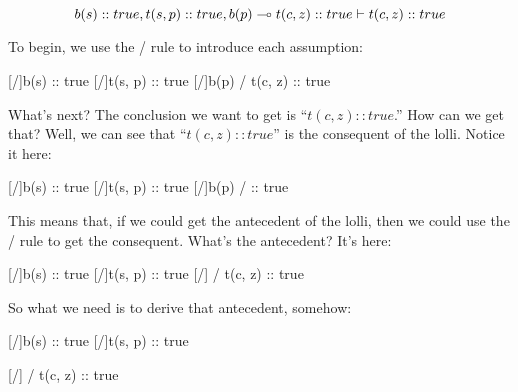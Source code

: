 \documentclass[../../../main.tex]{subfiles}
\begin{document}
\begin{equation*}
  b(s) :: true, t(s, p) :: true, b(p) \lolli/ t(c, z) :: true \ndturnstile/ t(c, z) :: true
\end{equation*}

\noindent
To begin, we use the \startrule/ rule to introduce each assumption:

\begin{prooftree*}
  \hypo{}
  [\startrule/]{b(s) :: true}
  \hypo{}
  [\startrule/]{t(s, p) :: true}  
  \hypo{}
  [\startrule/]{b(p) \lolli/ t(c, z) :: true}  
\end{prooftree*}

\noindent
What's next? The conclusion we want to get is ``$t(c, z) :: true$.'' How can we get that? Well, we can see that ``$t(c, z) :: true$'' is the consequent of the lolli. Notice it here:

\begin{prooftree*}
  \hypo{}
  [\startrule/]{b(s) :: true}
  \hypo{}
  [\startrule/]{t(s, p) :: true}  
  \hypo{}
  [\startrule/]{b(p) \lolli/  :: true}  
\end{prooftree*}

\noindent
This means that, if we could get the antecedent of the lolli, then we could use the \lolliElim/ rule to get the consequent. What's the antecedent? It's here:

\begin{prooftree*}
  \hypo{}
  [\startrule/]{b(s) :: true}
  \hypo{}
  [\startrule/]{t(s, p) :: true}  
  \hypo{}
  [\startrule/]{ \lolli/ t(c, z) :: true}  
\end{prooftree*}

\noindent
So what we need is to derive that antecedent, somehow:

\begin{prooftree*}
  \hypo{}
  [\startrule/]{b(s) :: true}
  \hypo{}
  [\startrule/]{t(s, p) :: true}

  \ellipsis{}{}
  
  \hypo{}
  [\startrule/]{ \lolli/ t(c, z) :: true}  
  
\end{prooftree*}
\end{document}
